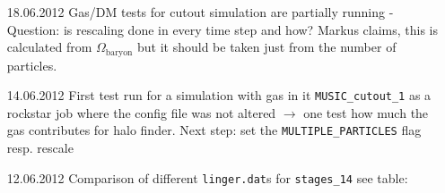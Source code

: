 \documentclass[a4paper,11pt,fleqn,oneside]{book}
\begin{document}
\begin{itemize}
\item[18.06.2012]
Gas/DM tests for cutout simulation are partially running - Question: is 
rescaling done in every time step and how? Markus claims, this is calculated 
from $\Omega_{\text{baryon}}$ but it should be taken just from the number 
of particles. 


\item[14.06.2012]
First test run for a simulation with gas in it \texttt{MUSIC\_cutout\_1} 
as a rockstar job where the config file was not altered $\rightarrow$ 
one test how much the gas contributes for halo finder. Next step: 
set the \texttt{MULTIPLE\_PARTICLES} flag resp. rescale \\

\item[12.06.2012]
Comparison of different \texttt{linger.dat}s for \texttt{stages\_14} see table: \\


\end{itemize}
\end{document}
